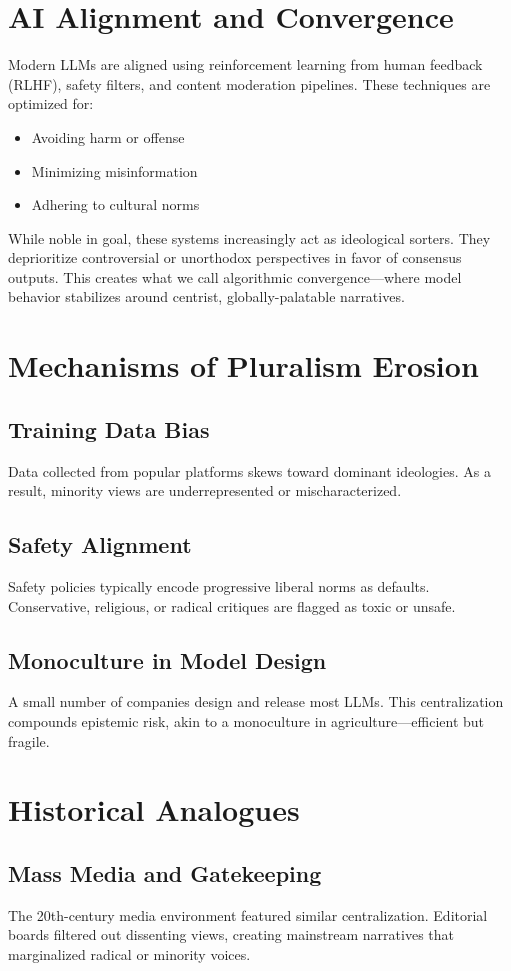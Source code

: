 \documentclass[11pt]{article}
\begin{document}
\section{AI Alignment and Convergence}
Modern LLMs are aligned using reinforcement learning from human feedback (RLHF), safety filters, and content moderation pipelines. These techniques are optimized for:
\begin{itemize}
    \item Avoiding harm or offense
    \item Minimizing misinformation
    \item Adhering to cultural norms
\end{itemize}
While noble in goal, these systems increasingly act as ideological sorters. They deprioritize controversial or unorthodox perspectives in favor of consensus outputs. This creates what we call algorithmic convergence—where model behavior stabilizes around centrist, globally-palatable narratives.

\section{Mechanisms of Pluralism Erosion}
\subsection{Training Data Bias}
Data collected from popular platforms skews toward dominant ideologies. As a result, minority views are underrepresented or mischaracterized.

\subsection{Safety Alignment}
Safety policies typically encode progressive liberal norms as defaults. Conservative, religious, or radical critiques are flagged as toxic or unsafe.

\subsection{Monoculture in Model Design}
A small number of companies design and release most LLMs. This centralization compounds epistemic risk, akin to a monoculture in agriculture—efficient but fragile.

\section{Historical Analogues}
\subsection{Mass Media and Gatekeeping}
The 20th-century media environment featured similar centralization. Editorial boards filtered out dissenting views, creating mainstream narratives that marginalized radical or minority voices.
\end{document}
